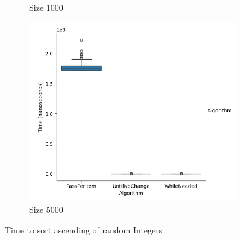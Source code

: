 \documentclass{article}
\begin{document}
\begin{figure}[ht]
\begin{subfigure}{0.3\textwidth}
    \caption{Size 1000}
    \label{fig:img2}
  \end{subfigure}
  \begin{subfigure}{0.3\textwidth}
    \centering
    \includegraphics[width=\linewidth]{../figureIntAsc5000.png}
    \caption{Size 5000}
    \label{fig:img3}
  \end{subfigure}
  \caption{Time to sort ascending of random Integers}
  \label{fig:three_images}
\end{figure}
\end{document}
